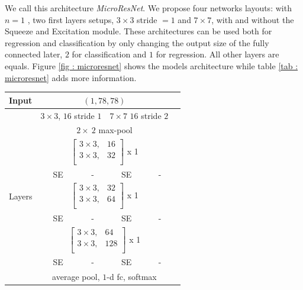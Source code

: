 \documentclass[../document.tex]{subfiles}
\begin{document}
We call this architecture \emph{MicroResNet}. We propose four networks layouts: with $n=1$ , two first layers setups, $3\times3$ stride $=1$ and $7\times7$, with and without the Squeeze and Excitation module. These architectures can be used both for regression and classification by only changing the output size of the fully connected later, $2$ for classification and $1$ for regression. All other layers are equals. Figure \ref{fig : microresnet} shows the models architecture while table \ref{tab : microresnet} adds more information.
\begin{table}[htbp]
    \centering
        \begin{tabular}{@{}l|c|c|c|cc@{}}
        \hline
             Input   &  \multicolumn{4}{c}{$(1,78,78)$}  \\ 
            \hline 
            \multirow{12}{*}{Layers} & \multicolumn{2}{c}{$3 \times 3$, $16$ stride $1$} & \multicolumn{2}{c}{$7 \times 7$ $16$ stride $2$} \\
            \cline{2-5}
            &\multicolumn{4}{c}{$2 \times \ 2$ max-pool} \\ 
            \cline{2-5}
            &  \multicolumn{4}{c}{$\begin{bmatrix}
                3  \times 3, & 16 \\
                3  \times  3, & 32 \\  
               \end{bmatrix}$ x 1} \\ 
               \cline{2-5}
               &  SE & - & SE & -\\ 
               \cline{2-5}
               &  \multicolumn{4}{c}{$\begin{bmatrix}
                3  \times 3, & 32 \\
                3  \times  3, & 64 \\  
               \end{bmatrix}$ x 1} \\ 
               \cline{2-5}
               &  SE & - & SE & -\\ 
               \cline{2-5}

               &  \multicolumn{4}{c}{$\begin{bmatrix}
                3  \times 3, & 64 \\
                3  \times  3, & 128 \\  
               \end{bmatrix}$ x 1} \\
               \hline
               &  SE & - & SE & -\\ 
               \cline{2-5}
               &  \multicolumn{4}{c}{average pool, $1$-d fc, softmax} \\ 
               \hline
        

\end{tabular}
\end{table}
\end{document}
